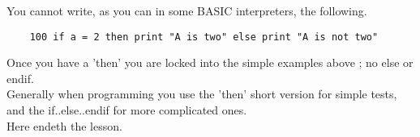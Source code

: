You cannot write, as you can in some BASIC interpreters, the following.

\begin{verbatim}
	100 if a = 2 then print "A is two" else print "A is not two"
\end{verbatim}

Once you have a 'then' you are locked into the simple examples above ; no else or endif.\\

Generally when programming you use the 'then' short version for simple tests, and the if..else..endif for more complicated ones.\\

Here endeth the lesson.

